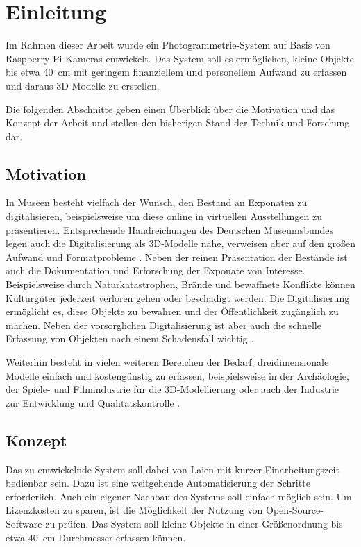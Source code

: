 \documentclass[./00PhotoBox]{subfiles}
\begin{document}
\chapter{Einleitung}
\label{c:einleitung}

Im Rahmen dieser Arbeit wurde ein Photogrammetrie-System auf Basis von Raspberry-Pi-Kameras entwickelt. Das System soll es ermöglichen, kleine Objekte bis etwa \SI{40}{\centi\metre} mit geringem finanziellem und personellem Aufwand zu erfassen und daraus 3D-Modelle zu erstellen.

Die folgenden Abschnitte geben einen Überblick über die Motivation und das Konzept der Arbeit und stellen den bisherigen Stand der Technik und Forschung dar.

\section{Motivation}

In Museen besteht vielfach der Wunsch, den Bestand an Exponaten zu digitalisieren, beispielsweise um diese online in virtuellen Ausstellungen zu präsentieren. Entsprechende Handreichungen des Deutschen Museumsbundes legen auch die Digitalisierung als 3D-Modelle nahe, verweisen aber auf den großen Aufwand und Formatprobleme \citep[vgl.][S. 43]{handreichung_digital}. Neben der reinen Präsentation der Bestände ist auch die Dokumentation und Erforschung der Exponate von Interesse. Beispielsweise durch Naturkatastrophen, Brände und bewaffnete Konflikte können Kulturgüter jederzeit verloren gehen oder beschädigt werden. Die Digitalisierung ermöglicht es, diese Objekte zu bewahren und der Öffentlichkeit zugänglich zu machen. Neben der vorsorglichen Digitalisierung ist aber auch die schnelle Erfassung von Objekten nach einem Schadensfall wichtig \citep[vgl.][]{kulturgutretter}.

Weiterhin besteht in vielen weiteren Bereichen der Bedarf, dreidimensionale Modelle einfach und kostengünstig zu erfassen, beispielsweise in der Archäologie, der Spiele- und Filmindustrie für die 3D-Modellierung oder auch der Industrie zur Entwicklung und Qualitätskontrolle \citep[vgl.][S. 37f]{luhmann}.

\section{Konzept}
Das zu entwickelnde System soll dabei von Laien mit kurzer Einarbeitungszeit bedienbar sein. Dazu ist eine weitgehende Automatisierung der Schritte erforderlich. Auch ein eigener Nachbau des Systems soll einfach möglich sein. Um Lizenzkosten zu sparen, ist die Möglich\-keit der Nutzung von Open-Source-Software zu prüfen. Das System soll kleine Objekte in einer Größenordnung bis etwa \SI{40}{\centi\metre} Durchmesser erfassen können.
\end{document}
